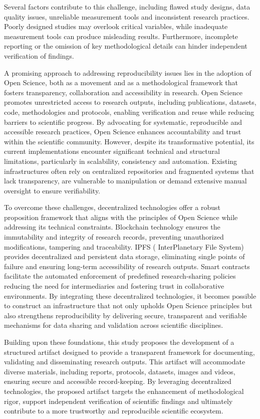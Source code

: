 \documentclass{article}
\begin{document}
Several factors contribute to this challenge, including flawed study designs, data quality issues, unreliable measurement tools and inconsistent research practices. Poorly designed studies may overlook critical variables, while inadequate measurement tools can produce misleading results. Furthermore, incomplete reporting or the omission of key methodological details can hinder independent verification of findings.

A promising approach to addressing reproducibility issues lies in the adoption of Open Science, both as a movement and as a methodological framework that fosters transparency, collaboration and accessibility in research. Open Science promotes unrestricted access to research outputs, including publications, datasets, code, methodologies and protocols, enabling verification and reuse while reducing barriers to scientific progress. By advocating for systematic, reproducible and accessible research practices, Open Science enhances accountability and trust within the scientific community. However, despite its transformative potential, its current implementations encounter significant technical and structural limitations, particularly in scalability, consistency and automation. Existing infrastructures often rely on centralized repositories and fragmented systems that lack transparency, are vulnerable to manipulation or demand extensive manual oversight to ensure verifiability.

To overcome these challenges, decentralized technologies offer a robust proposition framework that aligns with the principles of Open Science while addressing its technical constraints. Blockchain technology ensures the immutability and integrity of research records, preventing unauthorized modifications, tampering and traceability. IPFS ( InterPlanetary File System) provides decentralized and persistent data storage, eliminating single points of failure and ensuring long-term accessibility of research outputs. Smart contracts facilitate the automated enforcement of predefined research-sharing policies reducing the need for intermediaries and fostering trust in collaborative environments. By integrating these decentralized technologies, it becomes possible to construct an infrastructure that not only upholds Open Science principles but also strengthens reproducibility by delivering secure, transparent and verifiable mechanisms for data sharing and validation across scientific disciplines.

Building upon these foundations, this study proposes the development of a structured artifact designed to provide a transparent framework for documenting, validating and disseminating research outputs. This artifact will accommodate diverse materials, including reports, protocols, datasets, images and videos, ensuring secure and accessible record-keeping. By leveraging decentralized technologies, the proposed artifact targets the enhancement of methodological rigor, support independent verification of scientific findings and ultimately contribute to a more trustworthy and reproducible scientific ecosystem.
\end{document}
